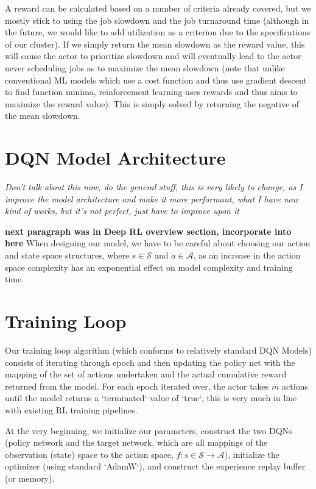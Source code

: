 \documentclass{article}
\begin{document}
\begin{spacing}{2.0}
A reward can be calculated based on a number of criteria already covered, but we mostly stick to using the job slowdown and the job turnaround time (although in the future,
we would like to add utilization as a criterion due to the specifications of our cluster). If we simply return the mean slowdown as the reward value, this will cause the
actor to prioritize slowdown and will eventually lead to the actor never scheduling jobs as to maximize the mean slowdown (note that unlike conventional ML models which
use a cost function and thus use gradient descent to find function minima, reinforcement learning uses rewards and thus aims to maximize the reward value). This is
simply solved by returning the negative of the mean slowdown.

\newpage
\section{DQN Model Architecture}

\textit{Don't talk about this now, do the general stuff, this is very likely to change, as I improve the model architecture and make it more performant, what I have now kind of works, but it's not perfect, just have to improve upon it}

\textbf{next paragraph was in Deep RL overview section, incorporate into here}
When designing our model, we have to be careful about choosing our action and state space structures, where $s \in \mathcal{S}$ and $a \in \mathcal{A}$,
as an increase in the action space complexity has an exponential effect on model complexity and training time.

\section{Training Loop}

Our training loop algorithm (which conforms to relatively standard DQN Models) consists of iterating through epoch and then updating the policy net with the mapping of
the set of actions undertaken and the actual cumulative reward returned from the model. For each epoch iterated over, the actor takes $m$ actions until the model
returns a `terminated` value of `true`, this is very much in line with existing RL training pipelines.

At the very beginning, we initialize our parameters, construct the two DQNs (policy network and the target network, which are all mappings of the observation (state)
space to the action space, $f: s \in \mathcal{S} \rightarrow \mathcal{A}$), initialize the optimizer (using standard `AdamW`), and construct the experience replay
buffer (or memory).


\end{spacing}
\end{document}
